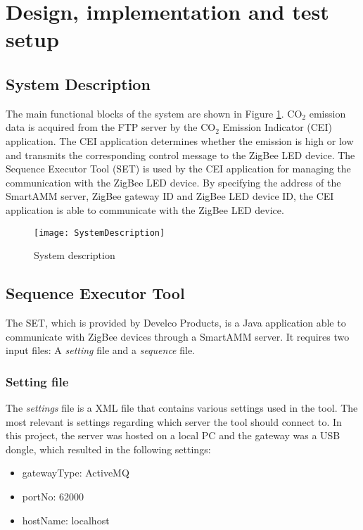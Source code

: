 \documentclass[Main]{subfiles}
\begin{document}
\section{Design, implementation and test setup} %
\label{sec:design_implementation_test_setup}

	\subsection{System Description}
		The main functional blocks of the system are shown in Figure \ref{fig:sysDesc}. 
		CO$_2$ emission data is acquired from the FTP server by the CO$_2$ Emission Indicator (CEI) application. 
		The CEI application determines whether the emission is high or low and transmits the corresponding control message to the ZigBee LED device. 
		The Sequence Executor Tool (SET) is used by the CEI application for managing the communication with the ZigBee LED device. 
		By specifying the address of the SmartAMM server, ZigBee gateway ID and ZigBee LED device ID, the CEI application is able to communicate with the ZigBee LED device.  

		\begin{figure}[H]
		\centering
		\texttt{[image: SystemDescription]}
		\caption{System description}
		\label{fig:sysDesc}
		\end{figure}




	 


	\newpage
	\subsection{Sequence Executor Tool}
		The SET, which is provided by Develco Products, is a Java application able to communicate with ZigBee devices through a SmartAMM server.
		It requires two input files: A \emph{setting} file and a \emph{sequence} file.

		\subsubsection{Setting file}
			The \emph{settings} file is a XML file that contains various settings used in the tool. 
			The most relevant is settings regarding which server the tool should connect to. 
			In this project, the server was hosted on a local PC and the gateway was a USB dongle, which resulted in the following settings:
			\begin{itemize}
				\item gatewayType: ActiveMQ
				\item portNo: 62000
				\item hostName: localhost
			\end{itemize}
\end{document}
